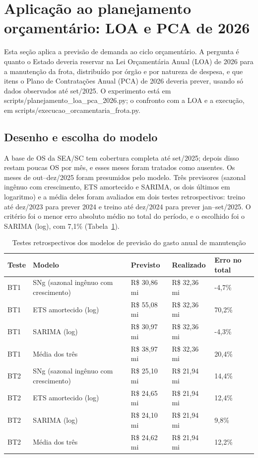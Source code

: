 \section{Aplicação ao planejamento orçamentário: LOA e PCA de 2026}
\label{sec:loa-pca-2026}
Esta seção aplica a previsão de demanda ao ciclo orçamentário. A pergunta é quanto o Estado deveria reservar na Lei Orçamentária Anual (LOA) de 2026 para a manutenção da frota, distribuído por órgão e por natureza de despesa, e que itens o Plano de Contratações Anual (PCA) de 2026 deveria prever, usando só dados observados até set/2025. O experimento está em scripts/planejamento\_loa\_pca\_2026.py; o confronto com a LOA e a execução, em scripts/execucao\_orcamentaria\_frota.py.
\subsection{Desenho e escolha do modelo}
A base de OS da SEA/SC tem cobertura completa até set/2025; depois disso restam poucas OS por mês, e esses meses foram tratados como ausentes. Os meses de out--dez/2025 foram presumidos pelo modelo. Três previsores (sazonal ingênuo com crescimento, ETS amortecido e SARIMA, os dois últimos em logaritmo) e a média deles foram avaliados em dois testes retrospectivos: treino até dez/2023 para prever 2024 e treino até dez/2024 para prever jan--set/2025. O critério foi o menor erro absoluto médio no total do período, e o escolhido foi o SARIMA (log), com 7,1\% (Tabela~\ref{tab:loa-backtest}).
\begin{table}[H]
\centering\small
\caption{Testes retrospectivos dos modelos de previsão do gasto anual de manutenção}
\label{tab:loa-backtest}
\begin{tabular}{p{}p{}p{}p{}p{}}
\hline
\textbf{Teste} & \textbf{Modelo} & \textbf{Previsto} & \textbf{Realizado} & \textbf{Erro no total} \\ \hline
BT1 & SNg (sazonal ingênuo com crescimento) & R\$ 30,86 mi & R\$ 32,36 mi & -4,7\% \\
BT1 & ETS amortecido (log) & R\$ 55,08 mi & R\$ 32,36 mi & 70,2\% \\
BT1 & SARIMA (log) & R\$ 30,97 mi & R\$ 32,36 mi & -4,3\% \\
BT1 & Média dos três & R\$ 38,97 mi & R\$ 32,36 mi & 20,4\% \\
BT2 & SNg (sazonal ingênuo com crescimento) & R\$ 25,10 mi & R\$ 21,94 mi & 14,4\% \\
BT2 & ETS amortecido (log) & R\$ 24,65 mi & R\$ 21,94 mi & 12,4\% \\
BT2 & SARIMA (log) & R\$ 24,10 mi & R\$ 21,94 mi & 9,8\% \\
BT2 & Média dos três & R\$ 24,62 mi & R\$ 21,94 mi & 12,2\% \\
\hline
\end{tabular}
\end{table}
